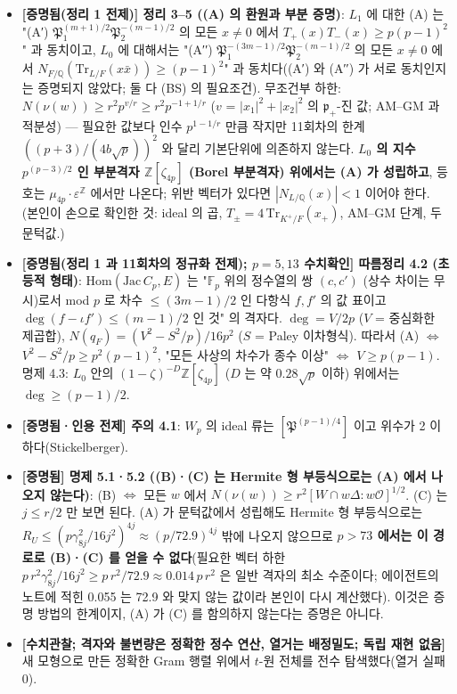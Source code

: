 \begin{itemize}
\item
  \textbf{{[}증명됨(정리 1 전제){]} 정리 3--5 ((A) 의 환원과 부분 증명)}: \(L_1\) 에 대한 (A) 는 "(A′) \(\mathfrak P_1^{(m+1)/2}\mathfrak P_2^{-(m-1)/2}\) 의 모든 \(x\ne0\) 에서 \(T_+(x)T_-(x)\ge p(p-1)^2\)" 과 동치이고, \(L_0\) 에 대해서는 "(A′′) \(\mathfrak P_1^{-(3m-1)/2}\mathfrak P_2^{-(m-1)/2}\) 의 모든 \(x\ne0\) 에서 \(N_{F/\mathbb Q}(\mathrm{Tr}_{L/F}(x\bar x))\ge(p-1)^2\)" 과 동치다((A′) 와 (A′′) 가 서로 동치인지는 증명되지 않았다; 둘 다 (BS) 의 필요조건). 무조건부 하한: \(N(\nu(w))\ge r^2p^{v/r}\ge r^2p^{-1+1/r}\) (\(v\) = \(|x_1|^2+|x_2|^2\) 의 \(\mathfrak p_+\)-진 값; AM--GM 과 적분성) --- 필요한 값보다 인수 \(p^{1-1/r}\) 만큼 작지만 11회차의 한계 \(((p+3)/(4b\sqrt p))^2\) 와 달리 기본단위에 의존하지 않는다. \textbf{\(L_0\) 의 지수 \(p^{(p-3)/2}\) 인 부분격자 \(\mathbb Z[\zeta_{4p}]\) (Borel 부분격자) 위에서는 (A) 가 성립하고}, 등호는 \(\mu_{4p}\cdot\varepsilon^{\mathbb Z}\) 에서만 나온다; 위반 벡터가 있다면 \(|N_{L/\mathbb Q}(x)|<1\) 이어야 한다. (본인이 손으로 확인한 것: ideal 의 곱, \(T_\pm=4\,\mathrm{Tr}_{K^+/F}(x_+)\), AM--GM 단계, 두 문턱값.)
\item
  \textbf{{[}증명됨(정리 1 과 11회차의 정규화 전제); \(p=5,13\) 수치확인{]} 따름정리 4.2 (초등적 형태)}: \(\mathrm{Hom}(\mathrm{Jac}\,C_p,E)\) 는 "\(\mathbb F_p\) 위의 정수열의 쌍 \((c,c')\) (상수 차이는 무시)로서 mod \(p\) 로 차수 \(\le(3m-1)/2\) 인 다항식 \(f,f'\) 의 값 표이고 \(\deg(f-\iota f')\le(m-1)/2\) 인 것" 의 격자다. \(\deg=V/2p\) (\(V\) = 중심화한 제곱합), \(N(q_F)=(V^2-S^2/p)/16p^2\) (\(S\) = Paley 이차형식). 따라서 (A) \(\iff\) \(V^2-S^2/p\ge p^2(p-1)^2\), "모든 사상의 차수가 종수 이상" \(\iff\) \(V\ge p(p-1)\). 명제 4.3: \(L_0\) 안의 \((1-\zeta)^{-D}\mathbb Z[\zeta_{4p}]\) (\(D\) 는 약 \(0.28\sqrt p\) 이하) 위에서는 \(\deg\ge(p-1)/2\).
\item
  \textbf{{[}증명됨·인용 전제{]} 주의 4.1}: \(W_p\) 의 ideal 류는 \([\mathfrak P^{(p-1)/4}]\) 이고 위수가 2 이하다(Stickelberger).
\item
  \textbf{{[}증명됨{]} 명제 5.1·5.2 ((B)·(C) 는 Hermite 형 부등식으로는 (A) 에서 나오지 않는다)}: (B) \(\iff\) 모든 \(w\) 에서 \(N(\nu(w))\ge r^2[W\cap w\Delta:w\mathcal O]^{1/2}\). (C) 는 \(j\le r/2\) 만 보면 된다. (A) 가 문턱값에서 성립해도 Hermite 형 부등식으로는 \(R_U\le(p\gamma_{8j}^2/16j^2)^{4j}\approx(p/72.9)^{4j}\) 밖에 나오지 않으므로 \textbf{\(p>73\) 에서는 이 경로로 (B)·(C) 를 얻을 수 없다}(필요한 벡터 하한 \(p\,r^2\gamma_{8j}^2/16j^2\ge p\,r^2/72.9\approx0.014\,p\,r^2\) 은 일반 격자의 최소 수준이다; 에이전트의 노트에 적힌 0.055 는 72.9 와 맞지 않는 값이라 본인이 다시 계산했다). 이것은 증명 방법의 한계이지, (A) 가 (C) 를 함의하지 않는다는 증명은 아니다.
\item
  \textbf{{[}수치관찰; 격자와 불변량은 정확한 정수 연산, 열거는 배정밀도; 독립 재현 없음{]}} 새 모형으로 만든 정확한 Gram 행렬 위에서 \(t\)-원 전체를 전수 탐색했다(열거 실패 0).
\end{itemize}

